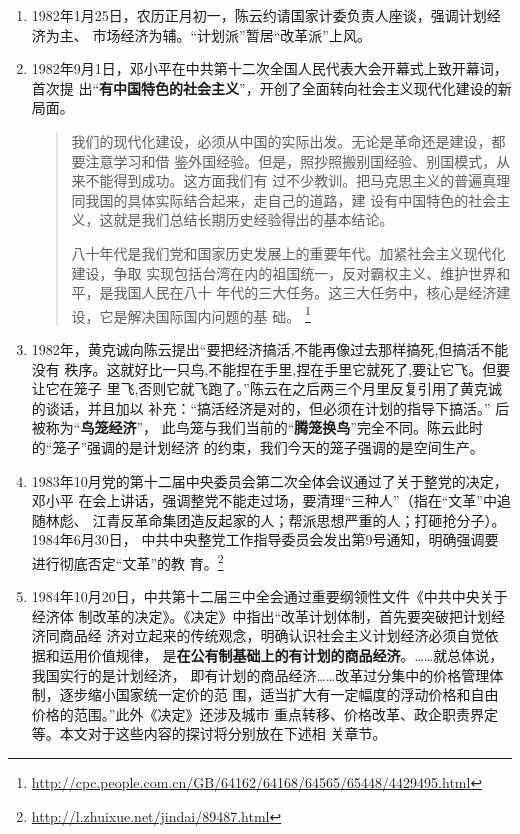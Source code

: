 \begin{enumerate}
\item 1982年1月25日，农历正月初一，陈云约请国家计委负责人座谈，强调计划经济为主、
  市场经济为辅。“计划派”暂居“改革派”上风。

\item 1982年9月1日，邓小平在中共第十二次全国人民代表大会开幕式上致开幕词，首次提
  出“\textbf{有中国特色的社会主义}”，开创了全面转向社会主义现代化建设的新局面。
  \begin{quotation}
    我们的现代化建设，必须从中国的实际出发。无论是革命还是建设，都要注意学习和借
    鉴外国经验。但是，照抄照搬别国经验、别国模式，从来不能得到成功。这方面我们有
    过不少教训。把马克思主义的普遍真理同我国的具体实际结合起来，走自己的道路，建
    设有中国特色的社会主义，这就是我们总结长期历史经验得出的基本结论。

    八十年代是我们党和国家历史发展上的重要年代。加紧社会主义现代化建设，争取
    实现包括台湾在内的祖国统一，反对霸权主义、维护世界和平，是我国人民在八十
    年代的三大任务。这三大任务中，核心是经济建设，它是解决国际国内问题的基
    础。
    \footnote{\url{http://cpc.people.com.cn/GB/64162/64168/64565/65448/4429495.html}}
  \end{quotation}

\item 1982年，黄克诚向陈云提出“要把经济搞活,不能再像过去那样搞死,但搞活不能没有
  秩序。这就好比一只鸟,不能捏在手里,捏在手里它就死了,要让它飞。但要让它在笼子
  里飞,否则它就飞跑了。”陈云在之后两三个月里反复引用了黄克诚的谈话，并且加以
  补充：“搞活经济是对的，但必须在计划的指导下搞活。” 后被称为“\textbf{鸟笼经济}”，
  此鸟笼与我们当前的“\textbf{腾笼换鸟}”完全不同。陈云此时的“笼子”强调的是计划经济
  的约束，我们今天的笼子强调的是空间生产。\cite{niaolongjingji}

\item 1983年10月党的第十二届中央委员会第二次全体会议通过了关于整党的决定，邓小平
  在会上讲话，强调整党不能走过场，要清理“三种人”（指在“文革”中追随林彪、
  江青反革命集团造反起家的人；帮派思想严重的人；打砸抢分子）。1984年6月30日，
  中共中央整党工作指导委员会发出第9号通知，明确强调要进行彻底否定“文革”的教
  育。\footnote{\url{http://l.zhuixue.net/jindai/89487.html}}

\item 1984年10月20日，中共第十二届三中全会通过重要纲领性文件《中共中央关于经济体
  制改革的决定》。《决定》中指出“改革计划体制，首先要突破把计划经济同商品经
  济对立起来的传统观念，明确认识社会主义计划经济必须自觉依据和运用价值规律，
  是\textbf{在公有制基础上的有计划的商品经济}。……就总体说，我国实行的是计划经济，
  即有计划的商品经济……改革过分集中的价格管理体制，逐步缩小国家统一定价的范
  围，适当扩大有一定幅度的浮动价格和自由价格的范围。”此外《决定》还涉及城市
  重点转移、价格改革、政企职责界定等。本文对于这些内容的探讨将分别放在下述相
  关章节。


\end{enumerate}
